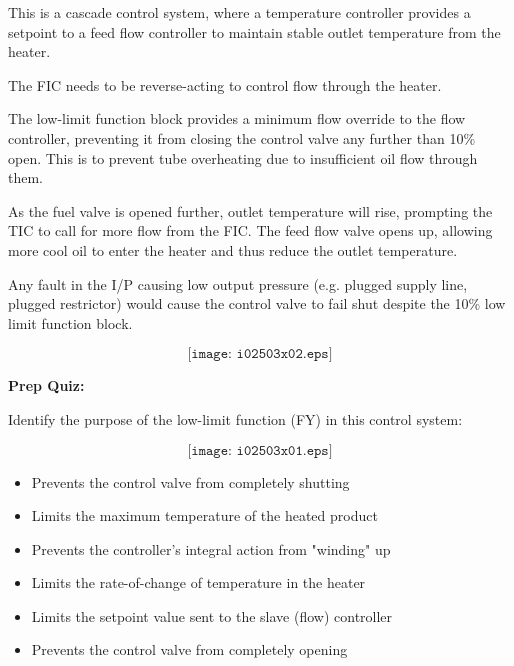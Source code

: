 












This is a cascade control system, where a temperature controller provides a setpoint to a feed flow controller to maintain stable outlet temperature from the heater.

\vskip 10pt

The FIC needs to be reverse-acting to control flow through the heater.

\vskip 10pt

The low-limit function block provides a minimum flow override to the flow controller, preventing it from closing the control valve any further than 10\% open.  This is to prevent tube overheating due to insufficient oil flow through them.

\vskip 10pt

As the fuel valve is opened further, outlet temperature will rise, prompting the TIC to call for more flow from the FIC.  The feed flow valve opens up, allowing more cool oil to enter the heater and thus reduce the outlet temperature.

\vskip 10pt

Any fault in the I/P causing low output pressure (e.g. plugged supply line, plugged restrictor) would cause the control valve to fail shut despite the 10\% low limit function block.

$$\texttt{[image: i02503x02.eps]}$$

\vfil \eject

\noindent
{\bf Prep Quiz:}

Identify the purpose of the low-limit function (FY) in this control system:

$$\texttt{[image: i02503x01.eps]}$$

\begin{itemize}
\item{} Prevents the control valve from completely shutting
\vskip 5pt 
\item{} Limits the maximum temperature of the heated product
\vskip 5pt 
\item{} Prevents the controller's integral action from "winding" up
\vskip 5pt 
\item{} Limits the rate-of-change of temperature in the heater
\vskip 5pt 
\item{} Limits the setpoint value sent to the slave (flow) controller
\vskip 5pt 
\item{} Prevents the control valve from completely opening
\end{itemize}







